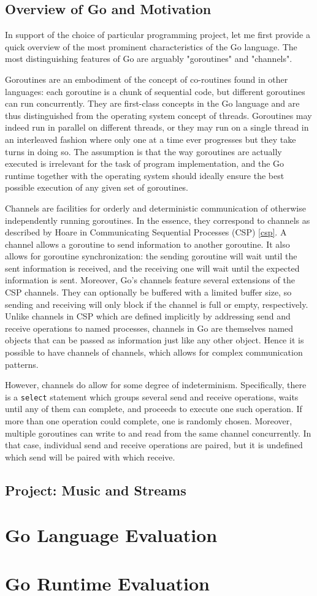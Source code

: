 \documentclass {article}
\begin{document}
\subsection{Overview of Go and Motivation}

In support of the choice of particular programming project, let me first provide a quick overview of the most prominent characteristics of the Go language. The most distinguishing features of Go are arguably "goroutines" and "channels".

Goroutines are an embodiment of the concept of co-routines found in other languages: each goroutine is a chunk of sequential code, but different goroutines can run concurrently. They are first-class concepts in the Go language and are thus distinguished from the operating system concept of threads. Goroutines may indeed run in parallel on different threads, or they may run on a single thread in an interleaved fashion where only one at a time ever progresses but they take turns in doing so. The assumption is that the way goroutines are actually executed is irrelevant for the task of program implementation, and the Go runtime together with the operating system should ideally ensure the best possible execution of any given set of goroutines.

Channels are facilities for orderly and deterministic communication of otherwise independently running goroutines. In the essence, they correspond to channels as described by Hoare in Communicating Sequential Processes (CSP) \ref{csp}. A channel allows a goroutine to send information to another goroutine. It also allows for goroutine synchronization: the sending goroutine will wait until the sent information is received, and the receiving one will wait until the expected information is sent. Moreover, Go's channels feature several extensions of the CSP channels. They can optionally be buffered with a limited buffer size, so sending and receiving will only block if the channel is full or empty, respectively. Unlike channels in CSP which are defined implicitly by addressing send and receive operations to named processes, channels in Go are themselves named objects that can be passed as information just like any other object. Hence it is possible to have channels of channels, which allows for complex communication patterns.

However, channels do allow for some degree of indeterminism. Specifically, there is a \lstinline|select| statement which groups several send and receive operations, waits until any of them can complete, and proceeds to execute one such operation. If more than one operation could complete, one is randomly chosen. Moreover, multiple goroutines can write to and read from the same channel concurrently. In that case, individual send and receive operations are paired, but it is undefined which send will be paired with which receive.

\subsection{Project: Music and Streams}


\section{Go Language Evaluation}
\label{sec:language}

\section{Go Runtime Evaluation}
\label{sec:runtime}
\end{document}
